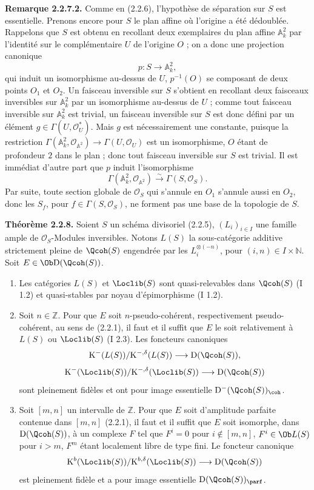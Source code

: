 \documentclass[11pt]{article}
\begin{document}
\textbf{Remarque 2.2.7.2.} Comme en (2.2.6), l'hypothèse de séparation sur $S$ est essentielle. Prenons encore pour $S$ le plan affine où l'origine a été dédoublée. Rappelons que $S$ est obtenu en recollant deux exemplaires du plan affine $\mathbb A^2_k$ par l'identité sur le complémentaire $U$ de l'origine $O$ ; on a donc une projection canonique
\[
p:S\longrightarrow\mathbb A^2_k,
\]
qui induit un isomorphisme au-dessus de $U$, $p^{-1}(O)$ se composant de deux points $O_1$ et $O_2$. Un faisceau inversible sur $S$ s'obtient en recollant deux faisceaux inversibles sur $\mathbb A^2_k$ par un isomorphisme au-dessus de $U$ ; comme tout faisceau inversible sur $\mathbb A^2_k$ est trivial, un faisceau inversible sur $S$ est donc défini par un élément $g\in\Gamma(U,\mathcal O_U^*)$. Mais $g$ est nécessairement une constante, puisque la restriction $\Gamma(\mathbb A^2_k,\mathcal O_{\mathbb A^2})\to\Gamma(U,\mathcal O_U)$ est un isomorphisme, $O$ étant de profondeur $2$ dans le plan ; donc tout faisceau inversible sur $S$ est trivial. Il est immédiat d'autre part que $p$ induit l'isomorphisme
\[
\Gamma(\mathbb A^2_k,\mathcal O_{\mathbb A^2})\xrightarrow{\sim}\Gamma(S,\mathcal O_S).
\]
Par suite, toute section globale de $\mathcal O_S$ qui s'annule en $O_1$ s'annule aussi en $O_2$, donc les $S_f$, pour $f\in\Gamma(S,\mathcal O_S)$, ne forment pas une base de la topologie de $S$.

\textbf{Théorème 2.2.8.} Soient $S$ un schéma divisoriel (2.2.5), $(L_i)_{i\in I}$ une famille ample de $\mathcal O_S$-Modules inversibles. Notons $L(S)$ la sous-catégorie additive strictement pleine de $\Qcoh(S)$ engendrée par les $L_i^{\otimes(-n)}$, pour $(i,n)\in I\times\mathbb N$. Soit $E\in\Ob\mathrm D(\Qcoh(S))$.
\begin{enumerate}[label=\alph*)]
\item Les catégories $L(S)$ et $\Loclib(S)$ sont quasi-relevables dans $\Qcoh(S)$ (I 1.2) et quasi-stables par noyau d'épimorphisme (I 1.2).
\item Soit $n\in\mathbb Z$. Pour que $E$ soit $n$-pseudo-cohérent, respectivement pseudo-cohérent, au sens de (2.2.1), il faut et il suffit que $E$ le soit relativement à $L(S)$ ou $\Loclib(S)$ (I 2.3). Les foncteurs canoniques
\[
\mathrm K^{-}(L(S))/\mathrm K^{-,\delta}(L(S))\longrightarrow \mathrm D(\Qcoh(S)),
\]
\[
\mathrm K^{-}(\Loclib(S))/\mathrm K^{-,\delta}(\Loclib(S))\longrightarrow \mathrm D(\Qcoh(S))
\]
sont pleinement fidèles et ont pour image essentielle $\mathrm D^{-}(\Qcoh(S))_{\coh}$.
\item Soit $[m,n]$ un intervalle de $\mathbb Z$. Pour que $E$ soit d'amplitude parfaite contenue dans $[m,n]$ (2.2.1), il faut et il suffit que $E$ soit isomorphe, dans $\mathrm D(\Qcoh(S))$, à un complexe $F$ tel que $F^i=0$ pour $i\notin[m,n]$, $F^i\in\Ob L(S)$ pour $i>m$, $F^m$ étant localement libre de type fini. Le foncteur canonique
\[
\mathrm K^b(\Loclib(S))/\mathrm K^{b,\delta}(\Loclib(S))\longrightarrow \mathrm D(\Qcoh(S))
\]
est pleinement fidèle et a pour image essentielle $\mathrm D(\Qcoh(S))_{\parf}$.
\end{enumerate}
\end{document}
